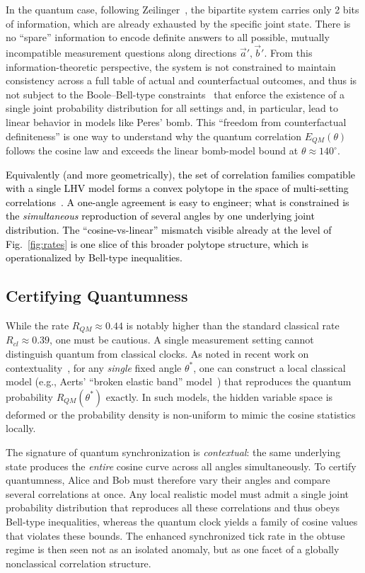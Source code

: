 \documentclass[reprint,aps,pra,longbibliography]{revtex4-2}
\newcommand{\rev}[1]{\textcolor{black}{#1}} %
\begin{document}
In the quantum case, following Zeilinger~\cite{zeil-99}, the bipartite system carries only 2 bits of information, which are already exhausted by the specific joint state. There is no ``spare'' information to encode definite answers to all possible, mutually incompatible measurement questions along directions $\vec{a}',\vec{b}'$. From this information-theoretic perspective, the system is not constrained to maintain consistency across a full table of actual and counterfactual outcomes, and thus is not subject to the Boole--Bell-type constraints~\cite{froissart-81,pitowsky-86} that enforce the existence of a single joint probability distribution for all settings and, in particular, lead to linear behavior in models like Peres' bomb. This ``freedom from counterfactual definiteness'' is one way to understand why the quantum correlation $E_{QM}(\theta)$ follows the cosine law and exceeds the linear bomb-model bound at $\theta \approx 140^\circ$.

\rev{Equivalently (and more geometrically), the set of correlation families compatible with a single LHV model forms a convex polytope in the space of multi-setting correlations~\cite{froissart-81,pitowsky-86}. A one-angle agreement is easy to engineer; what is constrained is the \emph{simultaneous} reproduction of several angles by one underlying joint distribution. The ``cosine-vs-linear'' mismatch visible already at the level of Fig.~\ref{fig:rates} is one slice of this broader polytope structure, which is operationalized by Bell-type inequalities.}

\subsection{Certifying Quantumness}
\label{sec:certify-quantumness}

While the rate $R_{QM} \approx 0.44$ is notably higher than the standard classical rate $R_{cl} \approx 0.39$, one must be cautious. A single measurement setting cannot distinguish quantum from classical clocks. As noted in recent work on contextuality~\cite{svozil-2022-epr}, for any \emph{single} fixed angle $\theta^*$, one can construct a local classical model (e.g., Aerts' ``broken elastic band'' model~\cite{aerts-69}) that reproduces the quantum probability $R_{QM}(\theta^*)$ exactly. In such models, the hidden variable space is deformed or the probability density is non-uniform to mimic the cosine statistics locally.

The signature of quantum synchronization is \emph{contextual}: the same underlying state produces the \emph{entire} cosine curve across all angles simultaneously. To certify quantumness, Alice and Bob must therefore vary their angles and compare several correlations at once. Any local realistic model must admit a single joint probability distribution that reproduces all these correlations and thus obeys Bell-type inequalities, whereas the quantum clock yields a family of cosine values that violates these bounds. The enhanced synchronized tick rate in the obtuse regime is then seen not as an isolated anomaly, but as one facet of a globally nonclassical correlation structure.
\end{document}
